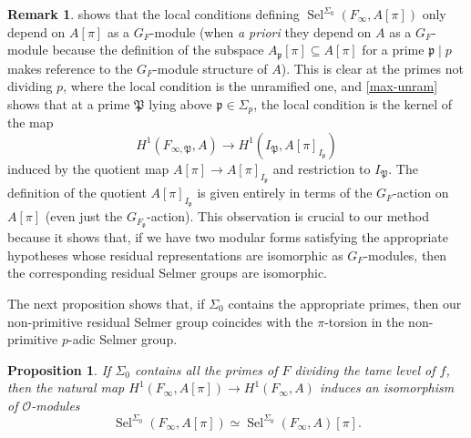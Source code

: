 \documentclass[12 pt]{amsart}
\theoremstyle{plain}
\newtheorem{prop}[thm]{Proposition}
\theoremstyle{definition}
\newtheorem{rem}[thm]{Remark}
\numberwithin{equation}{section}
\numberwithin{table}{section}
\begin{document}
\begin{rem}
\label{intrinsic}
 shows that the local conditions defining $\operatorname{Sel}^{\Sigma_0}(F_\infty,A[\pi])$ only depend on $A[\pi]$ as a $G_F$-module (when \emph{a priori} they depend on $A$ as a $G_F$-module because the definition of the subspace $A_\mathfrak{p}[\pi]\subseteq A[\pi]$ for a prime $\mathfrak{p}\mid p$ makes reference to the $G_F$-module structure of $A$). This is clear at the primes not dividing $p$, where the local condition is the unramified one, and \cref{max-unram} shows that at a prime $\mathfrak{P}$ lying above $\mathfrak{p}\in\Sigma_p$, the local condition is the kernel of the map 
\begin{equation*}
H^1(F_{\infty,\mathfrak{P}},A)\rightarrow H^1(I_\mathfrak{P},A[\pi]_{I_\mathfrak{p}})
\end{equation*}
induced by the quotient map $A[\pi]\rightarrow A[\pi]_{I_\mathfrak{p}}$ and restriction to $I_\mathfrak{P}$. The definition of the quotient $A[\pi]_{I_\mathfrak{p}}$ is given entirely in terms of the $G_F$-action on $A[\pi]$ (even just the $G_{F_\mathfrak{p}}$-action). This observation is crucial to our method because it shows that, if we have two modular forms satisfying the appropriate hypotheses whose residual representations are isomorphic as $G_F$-modules, then the corresponding residual Selmer groups are isomorphic.
\end{rem}
\indent The next proposition shows that, if $\Sigma_0$ contains the appropriate primes, then our non-primitive residual Selmer group coincides with the $\pi$-torsion in the non-primitive $p$-adic Selmer group.
\begin{prop}
\label{torsion-Selmer-isom}
If $\Sigma_0$ contains all the primes of $F$ dividing the tame level of $f$, then the natural map $H^1(F_\infty,A[\pi])\rightarrow H^1(F_\infty,A)$ induces an isomorphism of $\mathscr{O}$-modules 
\begin{equation*}
\operatorname{Sel}^{\Sigma_0}(F_\infty,A[\pi])\simeq\operatorname{Sel}^{\Sigma_0}(F_\infty,A)[\pi]\text{.}
\end{equation*}
\end{prop}
\end{document}
